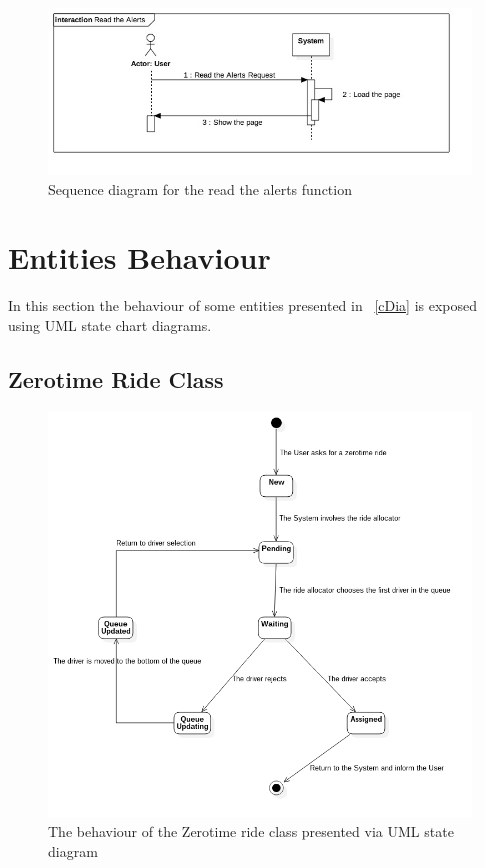 \begin{figure}[h!]
	\centerline{\includegraphics[width=\paperwidth]{./figures/SD_ReadTheAlerts.jpg}}
	\caption{Sequence diagram for the read the \glspl{alert} function}
\end{figure}



\clearpage

\section{Entities Behaviour}
In this section the behaviour of some entities presented in \figurename~\ref{cDia} is exposed using UML state chart diagrams.
\subsection{Zerotime Ride Class}
\begin{figure}[h!]
	\centerline{\includegraphics[width=\textwidth]{./figures/Statechart_ZerotimeRideClass.png}}
	\caption{The behaviour of the Zerotime ride class presented via UML state diagram}
\end{figure}

